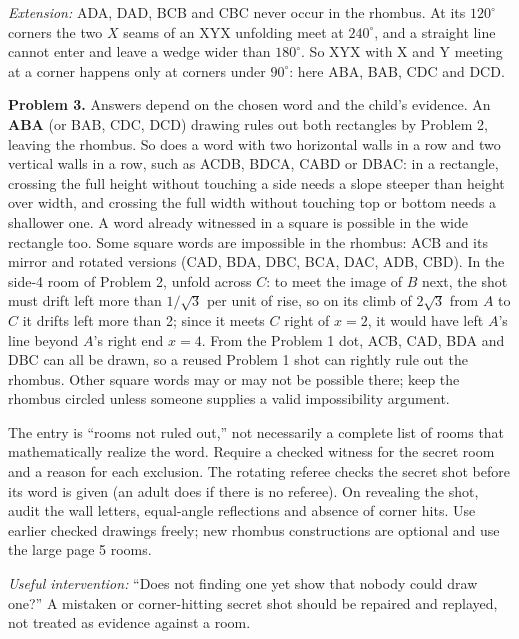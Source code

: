 \documentclass[11pt,letterpaper]{article}
\newcommand{\sectiontitle}[1]{\par\vspace{4pt}{\large\bfseries #1}\par}
\newcommand{\answer}[1]{\par\vspace{3pt}\textbf{Problem #1.} }
\begin{document}
\textit{Extension:} ADA, DAD, BCB and CBC never occur in the rhombus. At its $120^\circ$ corners the two $X$ seams of an XYX unfolding meet at $240^\circ$, and a straight line cannot enter and leave a wedge wider than $180^\circ$. So XYX with X and Y meeting at a corner happens only at corners under $90^\circ$: here ABA, BAB, CDC and DCD.
\newpage
\sectiontitle{Secret-room play and the all-word conclusion}
\answer{3} Answers depend on the chosen word and the child's evidence. An \textbf{ABA} (or BAB, CDC, DCD) drawing rules out both rectangles by Problem 2, leaving the rhombus. So does a word with two horizontal walls in a row and two vertical walls in a row, such as ACDB, BDCA, CABD or DBAC: in a rectangle, crossing the full height without touching a side needs a slope steeper than height over width, and crossing the full width without touching top or bottom needs a shallower one. A word already witnessed in a square is possible in the wide rectangle too. Some square words are impossible in the rhombus: ACB and its mirror and rotated versions (CAD, BDA, DBC, BCA, DAC, ADB, CBD). In the side-4 room of Problem 2, unfold across $C$: to meet the image of $B$ next, the shot must drift left more than $1/\sqrt3$ per unit of rise, so on its climb of $2\sqrt3$ from $A$ to $C$ it drifts left more than 2; since it meets $C$ right of $x=2$, it would have left $A$'s line beyond $A$'s right end $x=4$. From the Problem 1 dot, ACB, CAD, BDA and DBC can all be drawn, so a reused Problem 1 shot can rightly rule out the rhombus. Other square words may or may not be possible there; keep the rhombus circled unless someone supplies a valid impossibility argument.

The entry is ``rooms not ruled out,'' not necessarily a complete list of rooms that mathematically realize the word. Require a checked witness for the secret room and a reason for each exclusion. The rotating referee checks the secret shot before its word is given (an adult does if there is no referee). On revealing the shot, audit the wall letters, equal-angle reflections and absence of corner hits. Use earlier checked drawings freely; new rhombus constructions are optional and use the large page 5 rooms.

\textit{Useful intervention:} ``Does not finding one yet show that nobody could draw one?'' A mistaken or corner-hitting secret shot should be repaired and replayed, not treated as evidence against a room.
\end{document}
